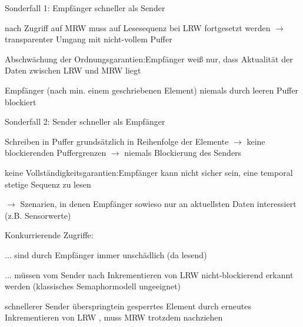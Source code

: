 \documentclass[a4paper]{article}
\begin{document}
\begin{multicols}{3}
    Sonderfall 1: Empfänger schneller als Sender

    \begin{itemize*}
        \item
        nach Zugriff auf MRW muss auf Lesesequenz bei LRW fortgesetzt werden
        $\rightarrow$ transparenter Umgang mit nicht-vollem
        Puffer
        \item
        Abschwächung der Ordnungsgarantien:Empfänger weiß nur, dass Aktualität
        der Daten zwischen LRW und MRW liegt
        \item
        Empfänger (nach min. einem geschriebenen Element) niemals durch leeren
        Puffer blockiert
    \end{itemize*}

    Sonderfall 2: Sender schneller als Empfänger

    \begin{itemize*}
        \item
        Schreiben in Puffer grundsätzlich in Reihenfolge der Elemente
        $\rightarrow$ keine blockierenden Puffergrenzen
        $\rightarrow$ niemals Blockierung des Senders
        \item
        keine Vollständigkeitsgarantien:Empfänger kann nicht sicher sein, eine
        temporal stetige Sequenz zu lesen
        \item
        $\rightarrow$ Szenarien, in denen Empfänger sowieso
        nur an aktuellsten Daten interessiert (z.B. Sensorwerte)
    \end{itemize*}

    Konkurrierende Zugriffe:

    \begin{itemize*}
        \item
        ... sind durch Empfänger immer unschädlich (da lesend)
        \item
        ... müssen vom Sender nach Inkrementieren von LRW nicht-blockierend
        erkannt werden (klassisches Semaphormodell ungeeignet)
        \item
        schnellerer Sender überspringtein gesperrtes Element durch erneutes
        Inkrementieren von LRW , muss MRW trotzdem nachziehen
    \end{itemize*}



\end{multicols}
\end{document}
